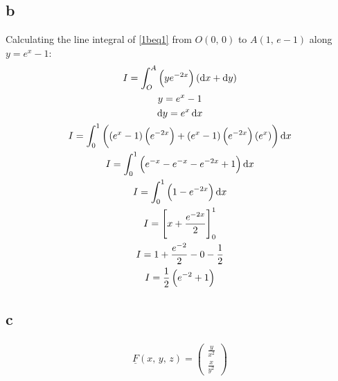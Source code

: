 \documentclass[11pt]{article}
\numberwithin{equation}{section}
\begin{document}
\subsection{b}
Calculating the line integral of \ref{1beq1} from $O\left(0, \, 0\right)$ to $A(1, \, e-1)$ along $y=e^x -1$:
\begin{gather}
    I = \int_O^A \left(ye^{-2x}\right)\left(\dif x + \dif y\right) \label{1beq1}\\
    y = e^x - 1\\
    \dif y = e^x \dif x\\
    I = \int_0^1 \left( \left( e^x-1\right) \left( e^{-2x} \right) + \left( e^x-1\right)\left( e^{-2x}\right)\left( e^x\right)\right)\dif x \\
    I = \int_0^1 \left(e^{-x} - e^{-x} - e^{-2x} +1\right)\dif x\\
    I = \int_0^1 \left(1-e^{-2x}\right)\dif x \\
    I = \left[x + \frac{e^{-2x}}{2}\right]_0^1\\
    I = 1 + \frac{e^{-2}}{2} -0-\frac{1}{2}\\
    I = \frac{1}{2}\left(e^{-2}+1\right)
\end{gather}
\subsection{c}
\begin{gather}
    \underline{F}\left(x, \, y, \, z\right) = \begin{pmatrix}
        \frac{y}{x^2}\\
        \frac{x}{y^2}
    \end{pmatrix}
\end{gather}
\end{document}
